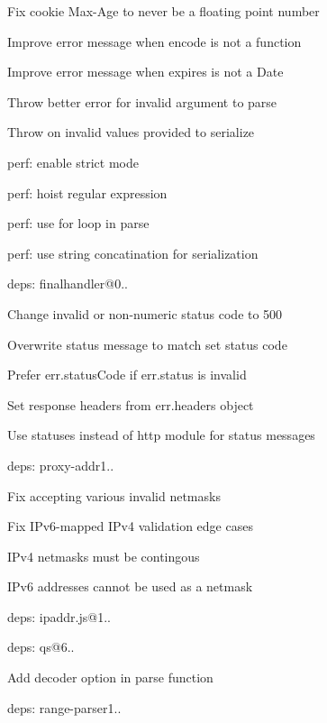 \begin{DoxyItemize}
\begin{DoxyItemize}
\item Fix cookie {\ttfamily Max-\/\+Age} to never be a floating point number
\item Improve error message when {\ttfamily encode} is not a function
\item Improve error message when {\ttfamily expires} is not a {\ttfamily Date}
\item Throw better error for invalid argument to parse
\item Throw on invalid values provided to {\ttfamily serialize}
\item perf\+: enable strict mode
\item perf\+: hoist regular expression
\item perf\+: use for loop in parse
\item perf\+: use string concatination for serialization
\end{DoxyItemize}
\item deps\+: finalhandler@0..
\begin{DoxyItemize}
\item Change invalid or non-\/numeric status code to 500
\item Overwrite status message to match set status code
\item Prefer {\ttfamily err.\+status\+Code} if {\ttfamily err.\+status} is invalid
\item Set response headers from {\ttfamily err.\+headers} object
\item Use {\ttfamily statuses} instead of {\ttfamily http} module for status messages
\end{DoxyItemize}
\item deps\+: proxy-\/addr1..
\begin{DoxyItemize}
\item Fix accepting various invalid netmasks
\item Fix I\+Pv6-\/mapped I\+Pv4 validation edge cases
\item I\+Pv4 netmasks must be contingous
\item I\+Pv6 addresses cannot be used as a netmask
\item deps\+: ipaddr.\+js@1..
\end{DoxyItemize}
\item deps\+: qs@6..
\begin{DoxyItemize}
\item Add {\ttfamily decoder} option in {\ttfamily parse} function
\end{DoxyItemize}
\item deps\+: range-\/parser1..

\end{DoxyItemize}
